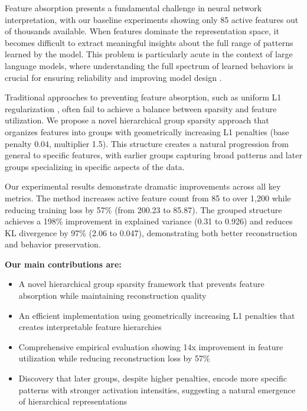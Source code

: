 \documentclass{article} %
\begin{document}
Feature absorption presents a fundamental challenge in neural network interpretation, with our baseline experiments showing only 85 active features out of thousands available. When features dominate the representation space, it becomes difficult to extract meaningful insights about the full range of patterns learned by the model. This problem is particularly acute in the context of large language models, where understanding the full spectrum of learned behaviors is crucial for ensuring reliability and improving model design \cite{vaswani2017attention}.

Traditional approaches to preventing feature absorption, such as uniform L1 regularization \cite{kingma2014adam}, often fail to achieve a balance between sparsity and feature utilization. We propose a novel hierarchical group sparsity approach that organizes features into groups with geometrically increasing L1 penalties (base penalty 0.04, multiplier 1.5). This structure creates a natural progression from general to specific features, with earlier groups capturing broad patterns and later groups specializing in specific aspects of the data.

Our experimental results demonstrate dramatic improvements across all key metrics. The method increases active feature count from 85 to over 1,200 while reducing training loss by 57\% (from 200.23 to 85.87). The grouped structure achieves a 198\% improvement in explained variance (0.31 to 0.926) and reduces KL divergence by 97\% (2.06 to 0.047), demonstrating both better reconstruction and behavior preservation.

\noindent\textbf{Our main contributions are:}
\begin{itemize}
    \item A novel hierarchical group sparsity framework that prevents feature absorption while maintaining reconstruction quality
    \item An efficient implementation using geometrically increasing L1 penalties that creates interpretable feature hierarchies
    \item Comprehensive empirical evaluation showing 14x improvement in feature utilization while reducing reconstruction loss by 57\%
    \item Discovery that later groups, despite higher penalties, encode more specific patterns with stronger activation intensities, suggesting a natural emergence of hierarchical representations
\end{itemize}
\end{document}
